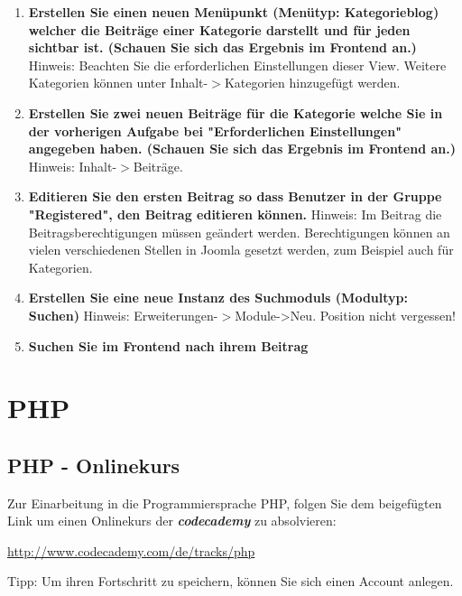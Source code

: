\documentclass[]{article}
\begin{document}
\begin{enumerate}
\item \textbf{Erstellen Sie einen neuen Menüpunkt (Menütyp: Kategorieblog) welcher die Beiträge einer Kategorie darstellt und für jeden sichtbar ist. (Schauen Sie sich das Ergebnis im Frontend an.)} \newline
Hinweis: Beachten Sie die erforderlichen Einstellungen dieser View. Weitere Kategorien können unter Inhalt-$>$Kategorien hinzugefügt werden.
\item \textbf{Erstellen Sie zwei neuen Beiträge für die Kategorie welche Sie in der vorherigen Aufgabe bei "Erforderlichen Einstellungen" angegeben haben. (Schauen Sie sich das Ergebnis im Frontend an.)} \newline
Hinweis: Inhalt-$>$Beiträge. 
\item \textbf{Editieren Sie den ersten Beitrag so dass Benutzer in der Gruppe "Registered", den Beitrag editieren können.} \newline
Hinweis: Im Beitrag die Beitragsberechtigungen müssen geändert werden. Berechtigungen können an vielen verschiedenen Stellen in Joomla gesetzt werden, zum Beispiel auch für Kategorien.
\item \textbf{Erstellen Sie eine neue Instanz des Suchmoduls (Modultyp: Suchen)} \newline
Hinweis: Erweiterungen-$>$Module->Neu. Position nicht vergessen!
\item \textbf{Suchen Sie im Frontend nach ihrem Beitrag} \newline
\end{enumerate}
\section{PHP}
\subsection{PHP - Onlinekurs}
Zur Einarbeitung in die Programmiersprache PHP, folgen Sie dem beigefügten Link um einen Onlinekurs der \textbf{\textit{codecademy}} zu absolvieren:
\begin{list}{}{}
\item \url{http://www.codecademy.com/de/tracks/php}
\end{list}
Tipp: Um ihren Fortschritt zu speichern, können Sie sich einen Account anlegen.
\end{document}
